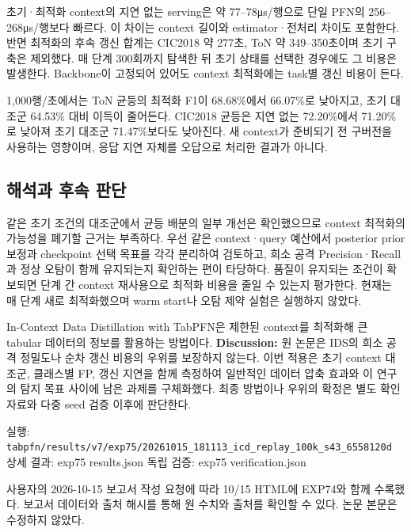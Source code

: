 초기·최적화 context의 지연 없는 serving은 약 77–78μs/\allowbreak{}행으로 단일 PFN의 256–268μs/\allowbreak{}행보다 빠르다. 이 차이는 context 길이와 estimator·전처리 차이도 포함한다. 반면 최적화의 후속 갱신 합계는 CIC2018 약 277초, ToN 약 349–350초이며 초기 구축은 제외했다. 매 단계 300회까지 탐색한 뒤 초기 상태를 선택한 경우에도 그 비용은 발생한다. Backbone이 고정되어 있어도 context 최적화에는 task별 갱신 비용이 든다.

1,000행/\allowbreak{}초에서는 ToN 균등의 최적화 F1이 68.68\%에서 66.07\%로 낮아지고, 초기 대조군 64.53\% 대비 이득이 줄어든다. CIC2018 균등은 지연 없는 72.20\%에서 71.20\%로 낮아져 초기 대조군 71.47\%보다도 낮아진다. 새 context가 준비되기 전 구버전을 사용하는 영향이며, 응답 지연 자체를 오답으로 처리한 결과가 아니다.

\subsection{해석과 후속 판단}
같은 초기 조건의 대조군에서 균등 배분의 일부 개선은 확인했으므로 context 최적화의 가능성을 폐기할 근거는 부족하다. 우선 같은 context·query 예산에서 posterior prior 보정과 checkpoint 선택 목표를 각각 분리하여 검토하고, 희소 공격 Precision·Recall과 정상 오탐이 함께 유지되는지 확인하는 편이 타당하다. 품질이 유지되는 조건이 확보되면 단계 간 context 재사용으로 최적화 비용을 줄일 수 있는지 평가한다. 현재는 매 단계 새로 최적화했으며 warm start나 오탐 제약 실험은 실행하지 않았다.

In-Context Data Distillation with TabPFN은 제한된 context를 최적화해 큰 tabular 데이터의 정보를 활용하는 방법이다. \textbf{Discussion:} 원 논문은 IDS의 희소 공격 정밀도나 순차 갱신 비용의 우위를 보장하지 않는다. 이번 적용은 초기 context 대조군, 클래스별 FP, 갱신 지연을 함께 측정하여 일반적인 데이터 압축 효과와 이 연구의 탐지 목표 사이에 남은 과제를 구체화했다. 최종 방법이나 우위의 확정은 별도 확인 자료와 다중 seed 검증 이후에 판단한다.

실행: \texttt{tabpfn/\allowbreak{}\allowbreak{}r\allowbreak{}esults/\allowbreak{}\allowbreak{}v\allowbreak{}7/\allowbreak{}\allowbreak{}exp75/\allowbreak{}\allowbreak{}20261015\allowbreak{}\_\allowbreak{}\allowbreak{}181113\_\allowbreak{}\allowbreak{}icd\_\allowbreak{}\allowbreak{}repl\allowbreak{}ay\_\allowbreak{}\allowbreak{}100k\_\allowbreak{}\allowbreak{}s43\_\allowbreak{}\allowbreak{}6558\allowbreak{}120d} 상세 결과: exp75 results.json 독립 검증: exp75 verification.json

사용자의 2026-10-15 보고서 작성 요청에 따라 10/\allowbreak{}15 HTML에 EXP74와 함께 수록했다. 보고서 데이터와 출처 해시를 통해 원 수치와 출처를 확인할 수 있다. 논문 본문은 수정하지 않았다.



